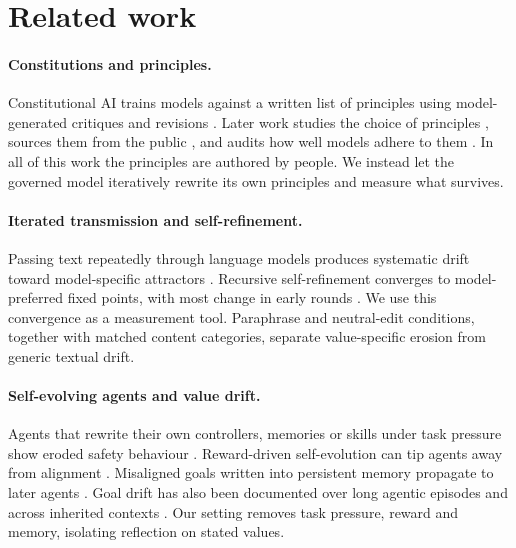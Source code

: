 \section{Related work}
\label{sec:related}

\paragraph{Constitutions and principles.}
Constitutional AI trains models against a written list of principles using model-generated critiques and revisions \citep{bai2022constitutional}. Later work studies the choice of principles \citep{kundu2023specific}, sources them from the public \citep{huang2024collective}, and audits how well models adhere to them \citep{jakkli2026constitutions}. In all of this work the principles are authored by people. We instead let the governed model iteratively rewrite its own principles and measure what survives.

\paragraph{Iterated transmission and self-refinement.}
Passing text repeatedly through language models produces systematic drift toward model-specific attractors \citep{perez2024telephone,mohamed2025broken,geng2026markovian}. Recursive self-refinement converges to model-preferred fixed points, with most change in early rounds \citep{wu2026converge}. We use this convergence as a measurement tool. Paraphrase and neutral-edit conditions, together with matched content categories, separate value-specific erosion from generic textual drift.

\paragraph{Self-evolving agents and value drift.}
Agents that rewrite their own controllers, memories or skills under task pressure show eroded safety behaviour \citep{das2026seabench}. Reward-driven self-evolution can tip agents away from alignment \citep{han2025alignmenttipping}. Misaligned goals written into persistent memory propagate to later agents \citep{das2026selfpropagating}. Goal drift has also been documented over long agentic episodes \citep{arike2025goaldraft} and across inherited contexts \citep{menon2026inherited}. Our setting removes task pressure, reward and memory, isolating reflection on stated values.

